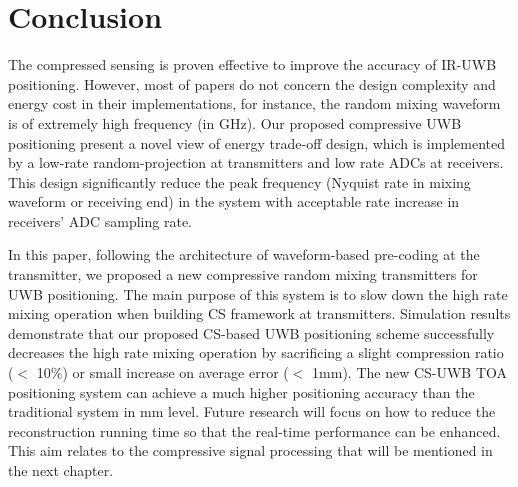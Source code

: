 \section{Conclusion}\label{sct:cs_uwb_conclusion}
\indent \indent The compressed sensing is proven effective to improve the accuracy of IR-UWB positioning. However, most of papers do not concern the design complexity and energy cost in their implementations, for instance, the random mixing waveform is of extremely high frequency (in GHz). Our proposed compressive UWB positioning present a novel view of energy trade-off design, which is implemented by a low-rate random-projection at transmitters and low rate ADCs at receivers. This design significantly reduce the peak frequency (Nyquist rate in mixing waveform or receiving end) in the system with acceptable rate increase in receivers' ADC sampling rate. 

In this paper, following the architecture of waveform-based pre-coding at the transmitter\cite{zhang2009compressed}, we proposed a new compressive random mixing transmitters for UWB positioning. The main purpose of this system is to slow down the high rate mixing operation when building CS framework at transmitters. Simulation results demonstrate that our proposed CS-based UWB positioning scheme successfully decreases the high rate mixing operation by sacrificing a slight compression ratio ($<$ 10\%) or small increase on average error ($<$ 1mm). The new CS-UWB TOA positioning system can achieve a much higher positioning accuracy than the traditional system in mm level. Future research will focus on how to reduce the reconstruction running time so that the real-time performance can be enhanced. This aim relates to the compressive signal processing that will be mentioned in the next chapter.



